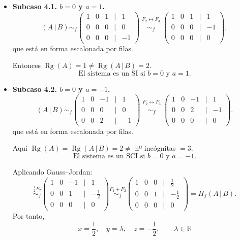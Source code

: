 \documentclass[a4paper,12pt]{article}
\begin{document}
\begin{ejercicio}[title=Ejercicio 31]
\begin{itemize}
\begin{itemize}
\item \textbf{Subcaso 4.1. \(b=0\) y \(a=1\).}
\[
(A\,|\,B)\sim_f
\begin{pmatrix}
1 & 0 & 1 &\Big|& 1\\
0 & 0 & 0 &\Big|& 0\\
0 & 0 & 0 &\Big|& -1
\end{pmatrix}
\overset{\substack{F_2\leftrightarrow F_3\\{}}}{\sim_f}
\begin{pmatrix}
1 & 0 & 1 &\Big|& 1\\
0 & 0 & 0 &\Big|& -1\\
0 & 0 & 0 &\Big|& 0
\end{pmatrix},
\]
que está en forma escalonada por filas.

Entonces \(\operatorname{Rg}(A)=1 \neq \operatorname{Rg}(A\,|\,B)=2\).  
\[
\boxed{\text{El sistema es un SI si } b=0 \text{ y } a=1.}
\]

\item \textbf{Subcaso 4.2. \(b=0\) y \(a=-1\).}
\[
(A\,|\,B)\sim_f
\begin{pmatrix}
1 & 0 & -1 &\Big|& 1\\
0 & 0 & 0 &\Big|& 0\\
0 & 0 & 2 &\Big|& -1
\end{pmatrix}
\overset{\substack{F_2\leftrightarrow F_3\\{}}}{\sim_f}
\begin{pmatrix}
1 & 0 & -1 &\Big|& 1\\
0 & 0 & 2 &\Big|& -1\\
0 & 0 & 0 &\Big|& 0
\end{pmatrix}.
\]
que está en forma escalonada por filas.

Aquí \(\operatorname{Rg}(A)=\operatorname{Rg}(A\,|\,B)=2 \neq\) nº incógnitas \(=3\).  
\[
\boxed{\text{El sistema es un SCI si } b=0 \text{ y } a=-1.}
\]

Aplicando Gauss–Jordan:
\[
\overset{\tfrac12 F_2}{\sim_f}
\begin{pmatrix}
1 & 0 & -1 &\Big|& 1\\
0 & 0 & 1 &\Big|& -\tfrac12\\
0 & 0 & 0 &\Big|& 0
\end{pmatrix}
\overset{F_1+F_2}{\sim_f}
\begin{pmatrix}
1 & 0 & 0 &\Big|& \tfrac12\\
0 & 0 & 1 &\Big|& -\tfrac12\\
0 & 0 & 0 &\Big|& 0
\end{pmatrix}=H_f(A\,|\,B).
\]
Por tanto,
\[
\boxed{\,x=\frac12,\quad y=\lambda,\quad z=-\frac12,\qquad \lambda\in\mathbb{R}\,}
\]


\end{itemize}
\end{itemize}
\end{ejercicio}
\end{document}
